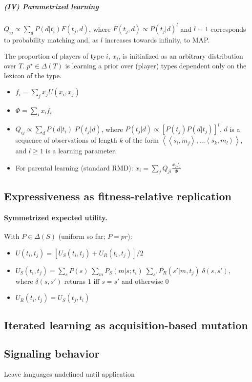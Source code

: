 \documentclass[a4paper]{article}
\newcommand{\tuple}[1]{\ensuremath{\left\langle #1 \right\rangle}}
\newcommand{\hl}[1]{\textcolor[rgb]{.8,.33,.0}{#1}}%
\begin{document}
\subparagraph{(IV) Parametrized learning} $Q_{ij} \propto \sum_d P(d|t_i) F(t_j,d)$, where $F(t_j,d) \propto P(t_j|d)^l$ and $l =1$ corresponds to probability matching and, as $l$ increases towards infinity, to MAP.  	      

The proportion of players of type $i$, $x_i$, is initialized as an arbitrary distribution over $T$. $p^\star \in \Delta(T)$ is learning a prior over (player) types dependent only on the lexicon of the type. 
\begin{itemize}
    \item $f_i = \sum_j x_j U(x_i,x_j)$
    \item $\Phi = \sum_i x_i f_i$
    \item $Q_{ij} \propto \sum_d P(d|t_i) \; P(t_j|d)$, where $P(t_j|d) \propto [P(t_j) P(d|t_j)]^l$, $d$ is a sequence of observations of length $k$ of the form \tuple{\tuple{s_i,m_j}, ... \tuple{s_k, m_l}}, and $l \geq 1$ is a learning parameter.
	\item For parental learning (standard RMD): $\dot x_i = \sum_j Q_{ji} \frac{x_j f_j}{\Phi}$
\end{itemize}


\subsection{Expressiveness as fitness-relative replication}

\paragraph{Symmetrized expected utility.} With $P \in \Delta(S)$ (uniform so far; $P = pr$):
\begin{itemize}

  \item $U(t_i,t_j) = [U_S(t_i,t_j) + U_R(t_i,t_j)] / 2$
  \item $U_S(t_i,t_j) = \sum_s P(s) \; \sum_m P_S(m|s;t_i) \; \sum_{s'} P_R(s'|m,t_j) \; \delta(s,s')$, where $\delta(s,s')$ returns $1$ iff $s = s'$ and otherwise $0$
  \item $U_R(t_i,t_j) = U_S(t_j,t_i)$
\end{itemize}

\subsection{Iterated learning as acquisition-based mutation}




\subsection{Signaling behavior}
\hl{Leave languages undefined until application}
\end{document}
